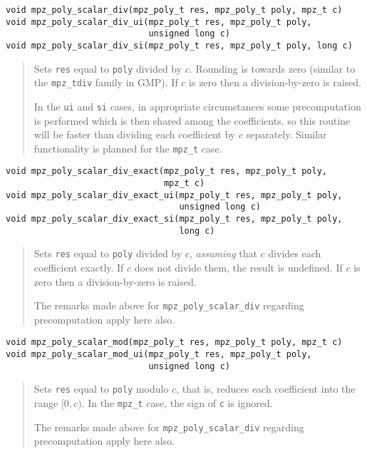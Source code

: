 \documentclass[a4paper,10pt]{article}
\newcommand{\code}{\lstinline}
\begin{document}
\begin{lstlisting}
void mpz_poly_scalar_div(mpz_poly_t res, mpz_poly_t poly, mpz_t c)
void mpz_poly_scalar_div_ui(mpz_poly_t res, mpz_poly_t poly,
                            unsigned long c)
void mpz_poly_scalar_div_si(mpz_poly_t res, mpz_poly_t poly, long c)
\end{lstlisting}
\begin{quote}
Sets \code{res} equal to \code{poly} divided by $c$. Rounding is towards zero (similar to the \code{mpz_tdiv} family in GMP). If $c$ is zero then a division-by-zero is raised.

In the \code{ui} and \code{si} cases, in appropriate circumstances some precomputation is performed which is then shared among the coefficients, so this routine will be faster than dividing each coefficient by $c$ separately. Similar functionality is planned for the \code{mpz_t} case.
\end{quote}


\begin{lstlisting}
void mpz_poly_scalar_div_exact(mpz_poly_t res, mpz_poly_t poly,
                               mpz_t c)
void mpz_poly_scalar_div_exact_ui(mpz_poly_t res, mpz_poly_t poly,
                                  unsigned long c)
void mpz_poly_scalar_div_exact_si(mpz_poly_t res, mpz_poly_t poly,
                                  long c)
\end{lstlisting}
\begin{quote}
Sets \code{res} equal to \code{poly} divided by $c$, \emph{assuming} that $c$ divides each coefficient exactly. If $c$ does not divide them, the result is undefined. If $c$ is zero then a division-by-zero is raised.

The remarks made above for \code{mpz_poly_scalar_div} regarding precomputation apply here also.
\end{quote}

\begin{lstlisting}
void mpz_poly_scalar_mod(mpz_poly_t res, mpz_poly_t poly, mpz_t c)
void mpz_poly_scalar_mod_ui(mpz_poly_t res, mpz_poly_t poly,
                            unsigned long c)
\end{lstlisting}
\begin{quote}
Sets \code{res} equal to \code{poly} modulo $c$, that is, reduces each coefficient into the range $[0, c)$. In the \code{mpz_t} case, the sign of \code{c} is ignored.

The remarks made above for \code{mpz_poly_scalar_div} regarding precomputation apply here also.
\end{quote}
\end{document}
